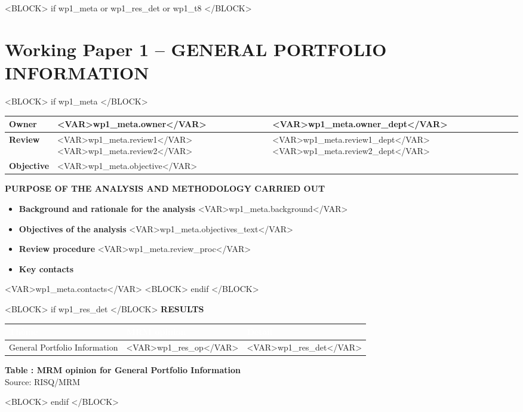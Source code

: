 \documentclass[10pt, a4paper]{article}
\newcounter{tableCounter}
\begin{document}
<BLOCK> if wp1_meta or wp1_res_det or wp1_t8 </BLOCK>
\section{Working Paper 1 -- GENERAL PORTFOLIO INFORMATION}

<BLOCK> if wp1_meta </BLOCK>
\noindent\begin{tabularx}{\textwidth}{|>{\centering\arraybackslash}p{3cm}|X|>{\centering\arraybackslash}p{4cm}|}
\hline
\rowcolor{sggray}
\textbf{Owner} & <VAR>wp1_meta.owner</VAR> & <VAR>wp1_meta.owner_dept</VAR> \\
\hline
\textbf{Review} & <VAR>wp1_meta.review1</VAR> \newline <VAR>wp1_meta.review2</VAR> & <VAR>wp1_meta.review1_dept</VAR> \newline <VAR>wp1_meta.review2_dept</VAR> \\
\hline
\textbf{Objective} & \multicolumn{2}{p{11.5cm}|}{<VAR>wp1_meta.objective</VAR>} \\
\hline
\end{tabularx}

\vspace{0.5cm}
\noindent\textbf{PURPOSE OF THE ANALYSIS AND METHODOLOGY CARRIED OUT}
\begin{itemize}
\item \textbf{Background and rationale for the analysis}
\newline <VAR>wp1_meta.background</VAR>

\item \textbf{Objectives of the analysis}
\newline <VAR>wp1_meta.objectives_text</VAR>

\item \textbf{Review procedure}
\newline <VAR>wp1_meta.review_proc</VAR>

\item \textbf{Key contacts}
\end{itemize}
<VAR>wp1_meta.contacts</VAR>
<BLOCK> endif </BLOCK>

<BLOCK> if wp1_res_det </BLOCK>
\vspace{0.5cm}
\noindent\textbf{RESULTS}

\vspace{0.3cm}
\noindent\begin{tabularx}{\textwidth}{|>{\centering\arraybackslash}p{3.5cm}|>{\centering\arraybackslash}p{3.5cm}|X|}
\hline
\rowcolor{sgred}
\centering\textcolor{white}{\textbf{Th\`{e}me}} & \centering\textcolor{white}{\textbf{MRM opinion}} & \centering\arraybackslash\textcolor{white}{\textbf{Detail}} \\
\hline
General Portfolio Information & <VAR>wp1_res_op</VAR> & <VAR>wp1_res_det</VAR> \\
\hline
\end{tabularx}
\begin{center}
\scriptsize \textbf{Table \thetableCounter: MRM opinion for General Portfolio Information} \\
Source: RISQ/MRM
\end{center}
<BLOCK> endif </BLOCK>
\end{document}
